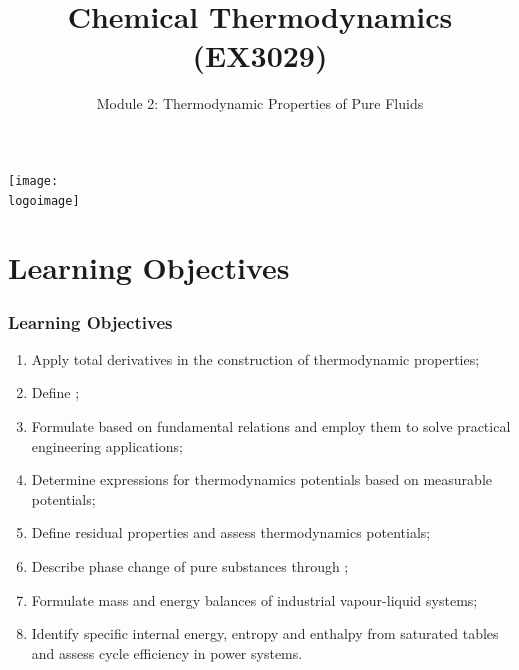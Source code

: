 \documentclass[10pt,compress,unknownkeysallowed]{beamer}
\institute{School of Engineering}
\title{Chemical Thermodynamics (EX3029)}
\subtitle{Module 2: Thermodynamic Properties of Pure Fluids}
\date[ ]{ }
\newcommand{\logoimage}{../../FigBanner/UoAHorizBanner}
\begin{document}
\begin{frame}
  \titlepage
  \vfill%
  \begin{center}
    \texttt{[image: \\logoimage]}
  \end{center}
\end{frame}





\section{Learning Objectives}

\begin{frame}
 \frametitle{Learning Objectives}
   \begin{enumerate}
     \item<1-> Apply total derivatives in the construction of thermodynamic properties;
     \item<1-> Define ;
     \item<1-> Formulate  based on fundamental relations and employ them to solve practical engineering applications;
     \item<1-> Determine expressions for thermodynamics potentials based on measurable potentials;
     \item<1-> Define residual properties and assess thermodynamics potentials;
     \item<1-> Describe phase change of pure substances through ;
     \item<1-> Formulate mass and energy balances of industrial vapour-liquid systems;
     \item<1-> Identify specific internal energy, entropy and enthalpy from saturated tables and assess cycle efficiency in power systems.
   \end{enumerate}

\end{frame}
\end{document}
